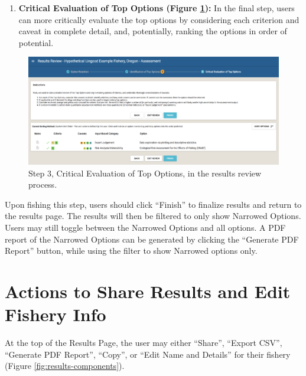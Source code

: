\documentclass[
  11pt,
]{book}
\providecommand{\tightlist}{%
  \setlength{\itemsep}{0pt}\setlength{\parskip}{0pt}}
\begin{document}
\begin{enumerate}
\def\labelenumi{\arabic{enumi}.}
\setcounter{enumi}{2}
\tightlist
\item
  \textbf{Critical Evaluation of Top Options (Figure \ref{fig:review-step-3}):} In the final step, users can more critically evaluate the top options by considering each criterion and caveat in complete detail, and, potentially, ranking the options in order of potential.
\end{enumerate}

\begin{figure}

{\centering \includegraphics[width=0.95\linewidth]{images/review-step-3} 

}

\caption{Step 3, Critical Evaluation of Top Options, in the results review process.}\label{fig:review-step-3}
\end{figure}

Upon fishing this step, users should click ``Finish'' to finalize results and return to the results page. The results will then be filtered to only show Narrowed Options. Users may still toggle between the Narrowed Options and all options. A PDF report of the Narrowed Options can be generated by clicking the ``Generate PDF Report'' button, while using the filter to show Narrowed options only.

\hypertarget{Results-Actions}{%
\section{Actions to Share Results and Edit Fishery Info}\label{Results-Actions}}

At the top of the Results Page, the user may either ``Share'', ``Export CSV'', ``Generate PDF Report'', ``Copy'', or ``Edit Name and Details'' for their fishery (Figure \ref{fig:results-components}).
\end{document}
